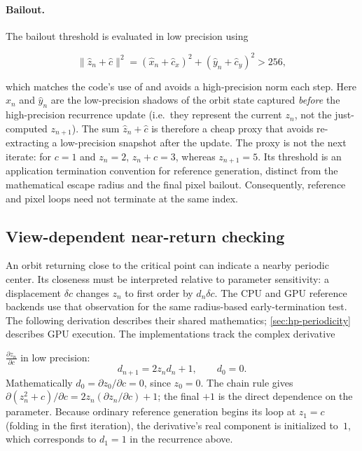 \paragraph{Bailout.}

The bailout threshold is evaluated in low precision using

\begin{equation}
  \lVert\hat{z}_n + \hat{c}\rVert^2 = (\hat{x}_n + \hat{c}_x)^2 + (\hat{y}_n + \hat{c}_y)^2 > 256,
  \label{eq:bailout-test}
\end{equation}

which matches the code's use of  and avoids a high-precision
norm each step.  Here \(\hat{x}_n\) and \(\hat{y}_n\) are the low-precision
shadows of the orbit state captured \emph{before} the high-precision recurrence
update (i.e.\ they represent the current \(z_n\), not the just-computed
\(z_{n+1}\)).  The sum \(\hat{z}_n + \hat{c}\) is therefore a cheap proxy that
avoids re-extracting a low-precision snapshot after the update.
The proxy is not the next iterate: for $c=1$ and $z_n=2$,
$z_n+c=3$, whereas $z_{n+1}=5$.  Its threshold is an application termination
convention for reference generation, distinct from the mathematical escape
radius and the final pixel bailout.  Consequently, reference and pixel loops
need not terminate at the same index.

\subsection{View-dependent near-return checking}
\label{subsec:ref-orbit-periodicity}

An orbit returning close to the critical point can indicate a nearby periodic
center.  Its closeness must be interpreted relative to parameter sensitivity:
a displacement $\delta c$ changes $z_n$ to first order by $d_n\delta c$.
The CPU and GPU reference backends use that observation for the same
radius-based early-termination test. The following derivation describes their
shared mathematics; \cref{sec:hp-periodicity} describes GPU execution.
The implementations track the complex derivative

\(\frac{\partial z_n}{\partial c}\) in low precision:
\begin{equation}
  d_{n+1} = 2 z_n d_n + 1,\qquad d_0 = 0.
  \label{eq:dzdc-def}
\end{equation}
Mathematically \(d_0 = \partial z_0/\partial c = 0\), since \(z_0=0\).
The chain rule gives
$\partial(z_n^2+c)/\partial c=2z_n(\partial z_n/\partial c)+1$;
the final $+1$ is the direct dependence on the parameter.
Because ordinary reference generation begins its loop at \(z_1=c\) (folding in the
first iteration), the derivative's real component is initialized to~$1$,
which corresponds to \(d_1=1\) in the recurrence above.

